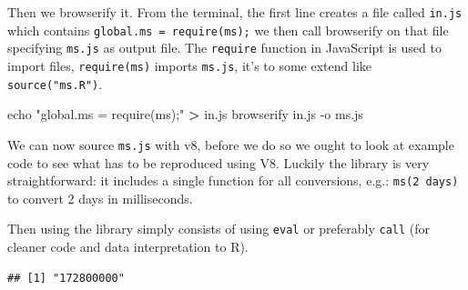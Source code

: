 \documentclass[
]{krantz}
\makeatletter
\newenvironment{Shaded}{\begin{snugshade}}{\end{snugshade}}
\newcommand{\BuiltInTok}[1]{#1}
\newcommand{\ExtensionTok}[1]{#1}
\newcommand{\KeywordTok}[1]{\textcolor[rgb]{0.27,0.27,0.27}{\textbf{#1}}}
\newcommand{\NormalTok}[1]{#1}
\newcommand{\OperatorTok}[1]{\textcolor[rgb]{0.43,0.43,0.43}{\textbf{#1}}}
\newcommand{\StringTok}[1]{\textcolor[rgb]{0.5,0.5,0.5}{#1}}
\newenvironment{kframe}{%
\medskip{}
\setlength{\fboxsep}{.8em}
 \def\at@end@of@kframe{}%
 \ifinner\ifhmode%
  \def\at@end@of@kframe{\end{minipage}}%
  \begin{minipage}{\columnwidth}%
 \fi\fi%
 \def\FrameCommand##1{\hskip\@totalleftmargin \hskip-\fboxsep
 \colorbox{shadecolor}{##1}\hskip-\fboxsep
     \hskip-\linewidth \hskip-\@totalleftmargin \hskip\columnwidth}%
 \MakeFramed {\advance\hsize-\width
   \@totalleftmargin\z@ \linewidth\hsize
   \@setminipage}}%
 {\par\unskip\endMakeFramed%
 \at@end@of@kframe}
\renewenvironment{Shaded}{\begin{kframe}}{\end{kframe}}
\makeatother
\begin{document}
Then we browserify it. From the terminal, the first line creates a file called \texttt{in.js} which contains \texttt{global.ms\ =\ require(\textquotesingle{}ms\textquotesingle{});} we then call browserify on that file specifying \texttt{ms.js} as output file. The \texttt{require} function in JavaScript is used to import files, \texttt{require(\textquotesingle{}ms\textquotesingle{})} imports \texttt{ms.js}, it's to some extend like \texttt{source("ms.R")}.

\begin{Shaded}
\begin{Highlighting}[]
\BuiltInTok{echo} \StringTok{"global.ms = require(\textquotesingle{}ms\textquotesingle{});"} \OperatorTok{\textgreater{}}\NormalTok{ in.js}
\ExtensionTok{browserify}\NormalTok{ in.js {-}o ms.js}
\end{Highlighting}
\end{Shaded}

We can now source \texttt{ms.js} with v8, before we do so we ought to look at example code to see what has to be reproduced using V8. Luckily the library is very straightforward: it includes a single function for all conversions, e.g.: \texttt{ms(\textquotesingle{}2\ days\textquotesingle{})} to convert 2 days in milliseconds.

\begin{Shaded}
\end{Shaded}

Then using the library simply consists of using \texttt{eval} or preferably \texttt{call} (for cleaner code and data interpretation to R).

\begin{Shaded}
\end{Shaded}

\begin{verbatim}
## [1] "172800000"
\end{verbatim}
\end{document}
